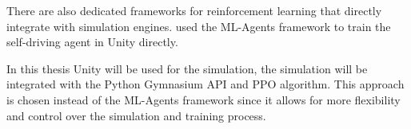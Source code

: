 There are also dedicated frameworks for reinforcement learning that directly integrate with simulation engines. \autocite{maximilian} used the ML-Agents framework \autocite{mlagents} to train the self-driving agent in Unity directly.

In this thesis Unity will be used for the simulation, the simulation will be integrated with the Python Gymnasium API and PPO algorithm. This approach is chosen instead of the ML-Agents framework since it allows for more flexibility and control over the simulation and training process.















